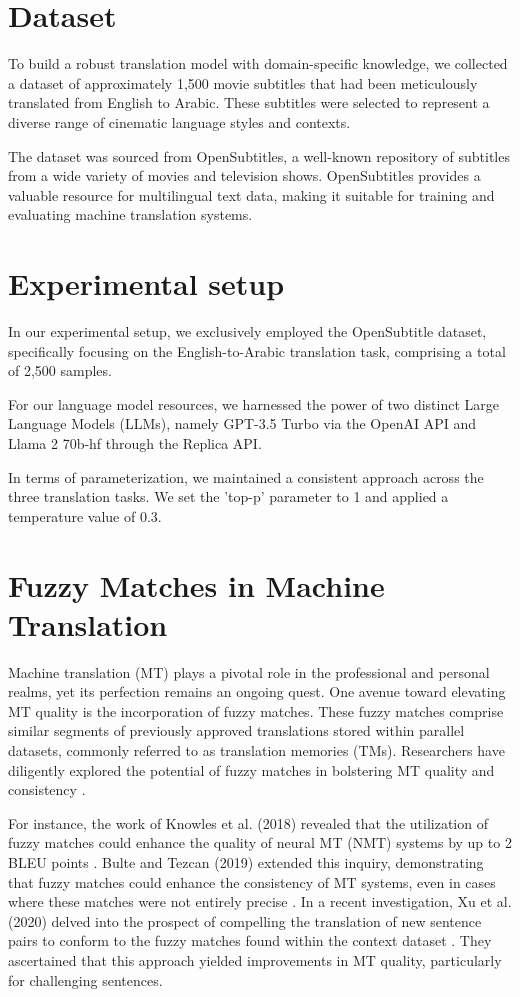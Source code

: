 \documentclass{article}
\begin{document}
\section{Dataset}
To build a robust translation model with domain-specific knowledge, we collected a dataset of approximately 1,500 movie subtitles that had been meticulously translated from English to Arabic. These subtitles were selected to represent a diverse range of cinematic language styles and contexts. 

The dataset was sourced from OpenSubtitles\cite{lison2016opensubtitles2016}, a well-known repository of subtitles
from a wide variety of movies and television shows. OpenSubtitles provides a valuable
resource for multilingual text data, making it suitable for training and evaluating
machine translation systems.


\section{Experimental setup}
In our experimental setup, we exclusively employed the OpenSubtitle dataset, specifically focusing on the English-to-Arabic translation task, comprising a total of 2,500 samples.

For our language model resources, we harnessed the power of two distinct Large Language Models (LLMs), namely GPT-3.5 Turbo via the OpenAI API and Llama 2 70b-hf through the Replica API.

In terms of parameterization, we maintained a consistent approach across the three translation tasks. We set the 'top-p' parameter to 1 and applied a temperature value of 0.3. 


\section{Fuzzy Matches in Machine Translation}

Machine translation (MT) plays a pivotal role in the professional and personal realms, yet its perfection remains an ongoing quest. One avenue toward elevating MT quality is the incorporation of fuzzy matches. These fuzzy matches comprise similar segments of previously approved translations stored within parallel datasets, commonly referred to as translation memories (TMs). Researchers have diligently explored the potential of fuzzy matches in bolstering MT quality and consistency \cite{knowles2018fuzzy,bulte2019fuzzy,xu2020forcing}.

For instance, the work of Knowles et al. (2018) revealed that the utilization of fuzzy matches could enhance the quality of neural MT (NMT) systems by up to 2 BLEU points \cite{knowles2018fuzzy}. Bulte and Tezcan (2019) extended this inquiry, demonstrating that fuzzy matches could enhance the consistency of MT systems, even in cases where these matches were not entirely precise \cite{bulte2019fuzzy}. In a recent investigation, Xu et al. (2020) delved into the prospect of compelling the translation of new sentence pairs to conform to the fuzzy matches found within the context dataset \cite{xu2020forcing}. They ascertained that this approach yielded improvements in MT quality, particularly for challenging sentences.
\end{document}
